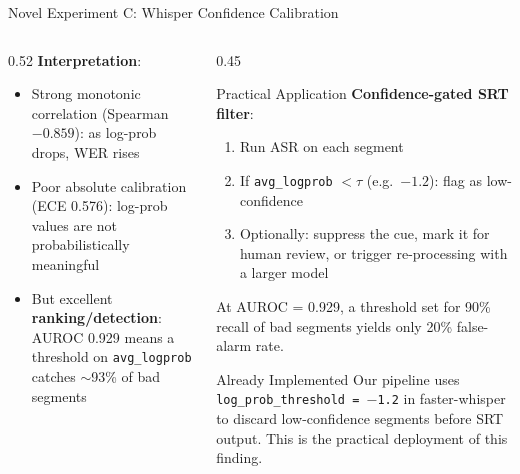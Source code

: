 \documentclass[aspectratio=169]{beamer}
\begin{document}
\begin{frame}{Novel Experiment C: Whisper Confidence Calibration}
\begin{columns}[T]
\begin{column}{0.52\textwidth}
      \vspace{0.2cm}
      \textbf{Interpretation}:
      \begin{itemize}
        \item Strong monotonic correlation (Spearman $-0.859$): as log-prob drops, WER rises
        \item Poor absolute calibration (ECE 0.576): log-prob values are not probabilistically meaningful
        \item But excellent \textbf{ranking/detection}: AUROC 0.929 means a threshold on \texttt{avg\_logprob} catches $\sim$93\% of bad segments
      \end{itemize}
    \end{column}
    \begin{column}{0.45\textwidth}
      \begin{block}{Practical Application}
        \textbf{Confidence-gated SRT filter}:
        \vspace{0.1cm}
        \begin{enumerate}
          \item Run ASR on each segment
          \item If \texttt{avg\_logprob} $< \tau$ (e.g.\ $-1.2$): flag as low-confidence
          \item Optionally: suppress the cue, mark it for human review, or trigger re-processing with a larger model
        \end{enumerate}
        \vspace{0.1cm}
        At AUROC = 0.929, a threshold set for 90\% recall of bad segments yields only 20\% false-alarm rate.
      \end{block}
      \begin{alertblock}{Already Implemented}
        Our pipeline uses \texttt{log\_prob\_threshold = $-$1.2} in faster-whisper to discard low-confidence segments before SRT output. This is the practical deployment of this finding.
      \end{alertblock}
    \end{column}
  \end{columns}
\end{frame}
\end{document}
